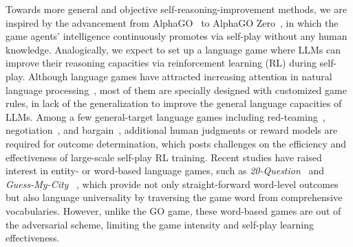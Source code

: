 \documentclass{article}
\theoremstyle{plain}
\theoremstyle{definition}
\theoremstyle{remark}
\begin{document}




Towards more general and objective self-reasoning-improvement methods, we are inspired by the advancement from AlphaGO~\citep{silver2016mastering} to AlphaGO Zero~\citep{silver2017mastering}, in which the game agents' intelligence continuously promotes via self-play without any human knowledge.
%
%
Analogically, we expect to set up a language game where LLMs can improve their reasoning capacities via reinforcement learning (RL) during self-play. 
Although language games have attracted increasing attention in natural language processing~\citep{lewis2017deal,hausknecht2020interactive,xu2023exploring,wu2024enhance}, most of them are specially designed with customized game rules, in lack of the generalization to improve the general language capacities of LLMs. Among a few general-target language games including red-teaming~\citep{ma2023red}, negotiation~\citep{lewis2017deal}, and bargain~\citep{abdulhai2023lmrl}, additional human judgments or reward models are required for outcome determination, which posts challenges on the efficiency and effectiveness of large-scale self-play RL training. Recent studies have raised interest in entity- or word-based language games, such as \textit{20-Question}~\citep{zhang2023entity} 
and \textit{Guess-My-City}~\citep{abdulhai2023lmrl}
, which provide not only straight-forward word-level outcomes but also language universality by traversing the game word from comprehensive vocabularies. However, unlike the GO game, these word-based games are out of the adversarial scheme, limiting the game intensity and self-play learning effectiveness. 
\end{document}
